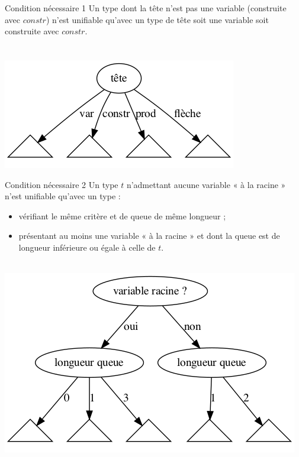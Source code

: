 \documentclass[serif]{beamer}
\newcommand{\?}{\stackrel{?}{=}}
\begin{document}
\begin{frame}{Condition nécessaire 1}
  Un type dont la tête n'est pas une variable (construite avec $constr$) n'est unifiable qu'avec un type de tête soit une variable soit construite avec $constr$. \\
  ~\\~\\
  \includegraphics[scale=0.5,center]{graphs/by_head}
\end{frame}


\begin{frame}{Condition nécessaire 2}
  Un type $t$ n'admettant aucune variable « à la racine » n'est unifiable qu'avec un type :
  \begin{itemize}
    \item vérifiant le même critère et de queue de même longueur ;
    \item présentant au moins une variable « à la racine » et dont la queue est de longueur inférieure ou égale à celle de $t$.
  \end{itemize}
  ~\\
  \includegraphics[scale=0.4,center]{graphs/by_tail_length}
\end{frame}
\end{document}
